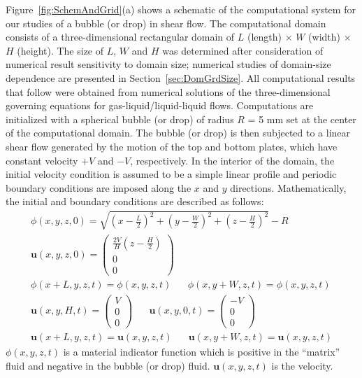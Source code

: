 \documentclass{elsarticle}
\newcommand{\vv}{\mathbf}
\newcommand{\bmu}{\vv{u}}
\begin{document}
Figure~\ref{fig:SchemAndGrid}(a) shows a schematic of the computational system
for our studies of a bubble (or drop) in shear flow.  The computational domain
consists of a three-dimensional rectangular domain of $L$ (length) $\times$ $W$
(width) $\times$ $H$ (height).  The size of $L$, $W$ and $H$ was determined
after consideration of numerical result sensitivity to domain size; numerical
studies of domain-size dependence are presented in
Section~\ref{sec:DomGrdSize}.  All computational results that follow were
obtained from numerical solutions of the three-dimensional governing equations
for gas-liquid/liquid-liquid flows.  Computations are initialized with a
spherical bubble (or drop) of radius $R$ = 5 mm set at the center of the
computational domain.   The bubble (or drop) is then subjected to a linear
shear flow generated by the motion of the top and bottom plates, which have
constant velocity $+V$ and $-V$, respectively.  In the interior of the domain,
the initial velocity condition is assumed to be a simple linear profile and
periodic boundary conditions are imposed along the $x$ and $y$ directions.
Mathematically, the initial and boundary conditions are described as follows:
%
\begin{eqnarray}
	\phi(x,y,z,0)=\sqrt{(x-\frac{L}{2})^{2}+(y-\frac{W}{2})^{2}+
	(z-\frac{H}{2})^{2}}-R \label{IC_BC} \\
	\bmu(x,y,z,0)=\left( \begin{array}{c}
		\frac{2V}{H}(z-\frac{H}{2}) \\ 0 \\ 0 
	\end{array} \right) \nonumber \\
	\phi(x+L,y,z,t)=\phi(x,y,z,t) \hspace{20pt}
	\phi(x,y+W,z,t)=\phi(x,y,z,t) \nonumber \\
	\bmu(x,y,H,t)=\left( \begin{array}{c}
		                V \\ 0 \\ 0 
	\end{array} \right)  \hspace{20pt}
	\bmu(x,y,0,t)=\left( \begin{array}{c}
		                -V \\ 0 \\ 0 
	\end{array} \right)  \nonumber \\
	\bmu(x+L,y,z,t)=\bmu(x,y,z,t) \hspace{20pt} 
	\bmu(x,y+W,z,t)=\bmu(x,y,z,t) \nonumber
\end{eqnarray}
%
$\phi(x,y,z,t)$ is a material indicator function which is positive in the
``matrix'' fluid and negative in the bubble (or drop) fluid.  $\bmu(x,y,z,t)$
is the velocity.
\end{document}
